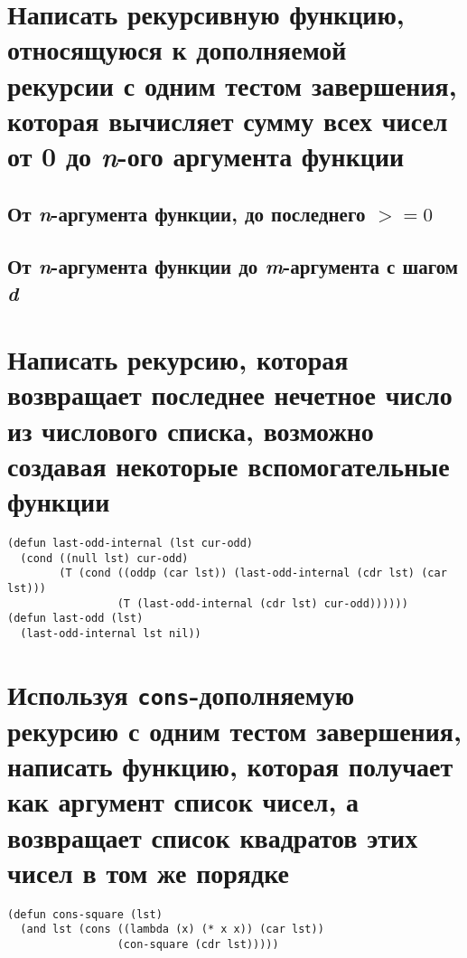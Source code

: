 \section{Написать рекурсивную функцию, относящуюся к дополняемой рекурсии с одним тестом завершения, которая вычисляет сумму всех чисел от 0 до \textit{n}-ого аргумента функции}


\subsection{От \textit{n}-аргумента функции, до последнего $>= 0$}

\subsection{От \textit{n}-аргумента функции до \textit{m}-аргумента с шагом \textit{d}}

\section{Написать рекурсию, которая возвращает последнее нечетное число из числового списка, возможно создавая некоторые вспомогательные функции}

\begin{lstlisting}
(defun last-odd-internal (lst cur-odd)
  (cond ((null lst) cur-odd)
        (T (cond ((oddp (car lst)) (last-odd-internal (cdr lst) (car lst)))
                 (T (last-odd-internal (cdr lst) cur-odd))))))
(defun last-odd (lst)
  (last-odd-internal lst nil))
\end{lstlisting}

\section{Используя \texttt{cons}-дополняемую рекурсию с одним тестом завершения, написать функцию, которая получает как аргумент список чисел, а возвращает список квадратов этих чисел в том же порядке}

\begin{lstlisting}
(defun cons-square (lst)
  (and lst (cons ((lambda (x) (* x x)) (car lst))
                 (con-square (cdr lst)))))
\end{lstlisting}

